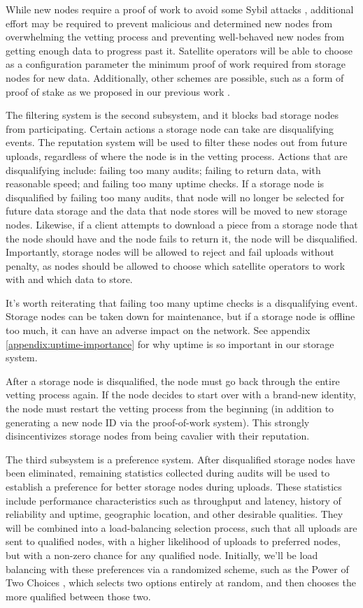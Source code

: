 \documentclass[11pt,fleqn,openany]{book}
\begin{document}
While new nodes require a proof of work to avoid some Sybil attacks
\cite{sybil-attack}, additional effort may be required to prevent
malicious and determined new nodes from overwhelming the vetting process and
preventing well-behaved new nodes from getting enough data to progress past it.
Satellite operators will be able to choose as a configuration
parameter the minimum proof of work required from storage nodes for new data.
Additionally, other schemes are possible, such as a form of proof of stake as
we proposed in our previous work \cite{sybil-cost}.

The filtering system is the second subsystem, and it blocks bad storage nodes from
participating.
Certain actions a storage node can take are disqualifying events. The
reputation system will be used to filter these nodes out from future uploads,
regardless of where the node is in the vetting process.
Actions that are disqualifying include: failing too many audits;
failing to return data, with reasonable speed; and failing too many uptime
checks.
If a storage node is disqualified by failing too many audits, that node will no
longer be selected for future data storage and the data that node stores will
be moved to new storage nodes.
Likewise, if a client attempts to download a piece from a storage node that
the node should have and the node fails to return it, the
node will be disqualified. Importantly, storage nodes will be allowed to reject
and fail uploads without penalty, as nodes should be allowed to choose which
satellite operators to work with and which data to store.

It's worth reiterating that failing too many uptime checks is a disqualifying
event. Storage nodes can be taken down for maintenance, but if a storage node
is offline too much, it can have an adverse impact on the network. See appendix
\ref{appendix:uptime-importance} for why uptime is so important in our storage
system.

After a storage node is disqualified, the node must go back through the entire
vetting process again. If the node decides to start over with a brand-new
identity, the node must restart the vetting process from the beginning (in
addition to generating a new node ID via the proof-of-work system). This
strongly disincentivizes storage nodes from being cavalier with their
reputation.

The third subsystem is a preference system. After disqualified storage nodes
have been eliminated, remaining statistics collected during audits
will be used to establish a preference for better storage nodes during uploads.
These statistics include performance characteristics such as throughput and
latency, history of reliability and uptime, geographic location, and other
desirable qualities.
They will be combined into a load-balancing selection process, such
that all uploads are sent to qualified nodes, with a higher likelihood of
uploads to preferred nodes, but with a non-zero chance for any qualified node.
Initially, we'll be load balancing with these preferences via a randomized
scheme, such as the Power of Two Choices \cite{power-of-two-choices}, which
selects two options entirely at random, and then chooses the more qualified
between those two.
\end{document}
